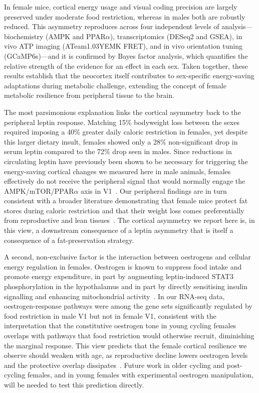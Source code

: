 \documentclass[11pt]{article}
\begin{document}
In female mice, cortical energy usage and visual coding precision are largely preserved under moderate food restriction, whereas in males both are robustly reduced. This asymmetry reproduces across four independent levels of analysis---biochemistry (AMPK and PPAR$\alpha$), transcriptomics (DESeq2 and GSEA), in vivo ATP imaging (ATeam1.03YEMK FRET), and in vivo orientation tuning (GCaMP6s)---and it is confirmed by Bayes factor analysis, which quantifies the relative strength of the evidence for an effect in each sex. Taken together, these results establish that the neocortex itself contributes to sex-specific energy-saving adaptations during metabolic challenge, extending the concept of female metabolic resilience from peripheral tissue to the brain.

The most parsimonious explanation links the cortical asymmetry back to the peripheral leptin response. Matching 15\% bodyweight loss between the sexes required imposing a 40\% greater daily caloric restriction in females, yet despite this larger dietary insult, females showed only a 28\% non-significant drop in serum leptin compared to the 72\% drop seen in males. Since reductions in circulating leptin have previously been shown to be necessary for triggering the energy-saving cortical changes we measured here in male animals, females effectively do not receive the peripheral signal that would normally engage the AMPK/mTOR/PPAR$\alpha$ axis in V1~\citep{zhang1994positional, steinberg2023ampk, laplante2013mtorc1, lopezdominguez2016omega3}. Our peripheral findings are in turn consistent with a broader literature demonstrating that female mice protect fat stores during caloric restriction and that their weight loss comes preferentially from reproductive and lean tissues~\citep{lovdel2024hsd11b1, greenfield2025lifespan, jeromson2024gdf15, ryu2023timerestricted}. The cortical asymmetry we report here is, in this view, a downstream consequence of a leptin asymmetry that is itself a consequence of a fat-preservation strategy.

A second, non-exclusive factor is the interaction between oestrogens and cellular energy regulation in females. Oestrogen is known to suppress food intake and promote energy expenditure, in part by augmenting leptin-induced STAT3 phosphorylation in the hypothalamus and in part by directly sensitising insulin signalling and enhancing mitochondrial activity~\citep{kwon2014gpr30, nestor2014crosstalk, elsehrawy2025eralpha}. In our RNA-seq data, oestrogen-response pathways were among the gene sets significantly regulated by food restriction in male V1 but not in female V1, consistent with the interpretation that the constitutive oestrogen tone in young cycling females overlaps with pathways that food restriction would otherwise recruit, diminishing the marginal response. This view predicts that the female cortical resilience we observe should weaken with age, as reproductive decline lowers oestrogen levels and the protective overlap dissipates~\citep{greenfield2025lifespan}. Future work in older cycling and post-cycling females, and in young females with experimental oestrogen manipulation, will be needed to test this prediction directly.
\end{document}
